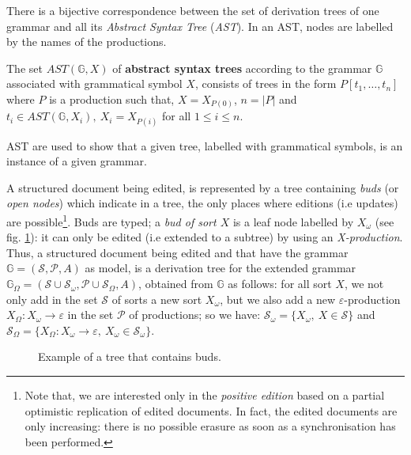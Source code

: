 There is a bijective correspondence between the set of derivation trees of one grammar and all its \textit{Abstract Syntax Tree} (\textit{AST}). In an AST, nodes are labelled by the names of the productions. 

\begin{definition}
The set $AST(\mathbb{G},X)$ of \textbf{abstract syntax trees} according to the grammar $\mathbb{G}$ associated with grammatical symbol $X$, consists of trees in the form $P[t_1,\ldots,t_n]$ where $P$ is a production such that, $X=X_{P(0)}$, $n=|P|$ and $t_i\in AST(\mathbb{G},X_i), ~X_{i} = X_{P(i)}$ for all $1\leq i\leq n$. 
\end{definition}
AST are used to show that a given tree, labelled with grammatical symbols, is an instance of a given grammar.

A structured document being edited, is represented by a tree containing \textit{buds} (or \textit{open nodes}) which indicate in a tree, the only places where editions (i.e updates) are possible\footnote{Note that, we are interested only in the \textit{positive edition} based on a partial optimistic replication \cite{Yasushi2005} of edited documents. In fact, the edited documents are only increasing: there is no possible erasure as soon as a synchronisation has been performed.}.
Buds are typed; a \textit{bud of sort $X$} is a leaf node labelled by $X_\omega$ (see fig. \ref{chap2:fig:tree-with-bud}): it can only be edited (i.e extended to a subtree) by using an \textit{X-production}. Thus, a structured document being edited and that have the grammar $\mathbb {G} = (\mathcal {S}, \mathcal {P}, A) $ as model, is a derivation tree for the extended grammar 
$\mathbb{G}_{\Omega}=(\mathcal{S}\cup\mathcal{S}_{\omega},\mathcal{P}\cup\mathcal{S}_{\Omega},A)$, obtained from $\mathbb {G} $ as follows: for all sort $X$, we not only add in the set $\mathcal{S}$ of sorts a new sort $X_{\omega}$, but we also add  a new $\varepsilon$-production $X_{\Omega} : X_{\omega} \rightarrow \varepsilon$ in the set $\mathcal {P}$ of productions; so we have: $\mathcal{S}_{\omega}=\{X_{\omega},~ X\in\mathcal {S}\}$ and $\mathcal{S}_{\Omega} = \{X_{\Omega} : X_{\omega} \rightarrow \varepsilon,~ X_{\omega} \in \mathcal{S}_{\omega}\}$.
\begin{figure}[ht!]
	\noindent
	\caption{Example of a tree that contains buds.}
	\label{chap2:fig:tree-with-bud}
\end{figure}



